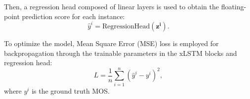 Then, a regression head composed of linear layers is used to obtain the floating-point prediction score for each instance:
\begin{equation}
    \hat{y}^i = \textrm{RegressionHead}\left(\boldsymbol{z^i}\right).
\end{equation}

To optimize the model, Mean Square Error (MSE) loss is employed for backpropagation through the trainable parameters in the xLSTM blocks and regression head:
\begin{equation}
    L = \frac{1}{n} \sum_{i=1}^{n}{\left(\hat{y}^i - y^i\right)^2},
\end{equation}
where $y^i$ is the ground truth MOS.

